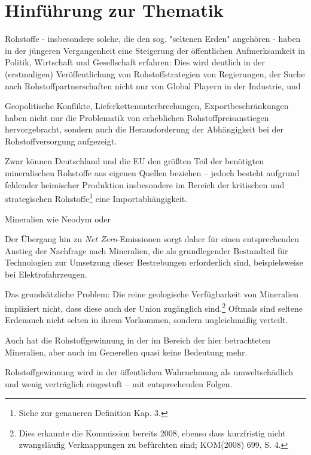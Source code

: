\documentclass[12pt,a4paper,oneside]{book} %
\begin{document}
	
	
	
	\tableofcontents
	
	\chapter{Hinführung zur Thematik}
	
	Rohstoffe - insbesondere solche, die den sog. "seltenen Erden" angehören - haben in der jüngeren Vergangenheit eine Steigerung der öffentlichen Aufmerksamkeit in Politik, Wirtschaft und Gesellschaft erfahren: Dies wird deutlich in der (erstmaligen) Veröffentlichung von Rohstoffstrategien von Regierungen, der Suche nach Rohstoffpartnerschaften nicht nur von Global Playern in der Industrie, und 
	
	Geopolitische Konflikte, Lieferkettenunterbrechungen, Exportbeschränkungen haben nicht nur die Problematik von erheblichen Rohstoffpreisanstiegen hervorgebracht, sondern auch die Herausforderung der Abhängigkeit bei der Rohstoffversorgung aufgezeigt. 
	
	Zwar können Deutschland und die EU den größten Teil der benötigten mineralischen Rohstoffe aus eigenen Quellen beziehen -- jedoch besteht aufgrund fehlender heimischer Produktion insbesondere im Bereich der kritischen und strategischen Rohstoffe\footnote{Siehe zur genaueren Definition Kap. 3.} eine Importabhängigkeit.\autocite{	Commodity TopNews 73, S. 3}
	
	Mineralien wie Neodym oder 
	
	Der Übergang hin zu \textit{Net Zero}-Emissionen sorgt daher für einen entsprechenden Anstieg der Nachfrage nach Mineralien, die als grundlegender Bestandteil für Technologien zur Umsetzung dieser Bestrebungen erforderlich sind, beispielsweise bei Elektrofahrzeugen.
	
	Das grundsätzliche Problem: Die reine geologische Verfügbarkeit von Mineralien impliziert nicht, dass diese auch der Union zugänglich sind.\footnote{Dies erkannte die Kommission bereits 2008, ebenso dass kurzfristig nicht zwangsläufig Verknappungen zu befürchten sind; KOM(2008) 699, S. 4.} Oftmals sind \glqq seltene Erden\grqq auch nicht selten in ihrem Vorkommen, sondern ungleichmäßig verteilt.
	
	Auch hat die Rohstoffgewinnung in der im Bereich der hier betrachteten Mineralien, aber auch im Generellen quasi keine Bedeutung mehr.
	
	Rohstoffgewinnung wird in der öffentlichen Wahrnehmung als umweltschädlich und wenig verträglich eingestuft -- mit entsprechenden Folgen.
	
\end{document}
